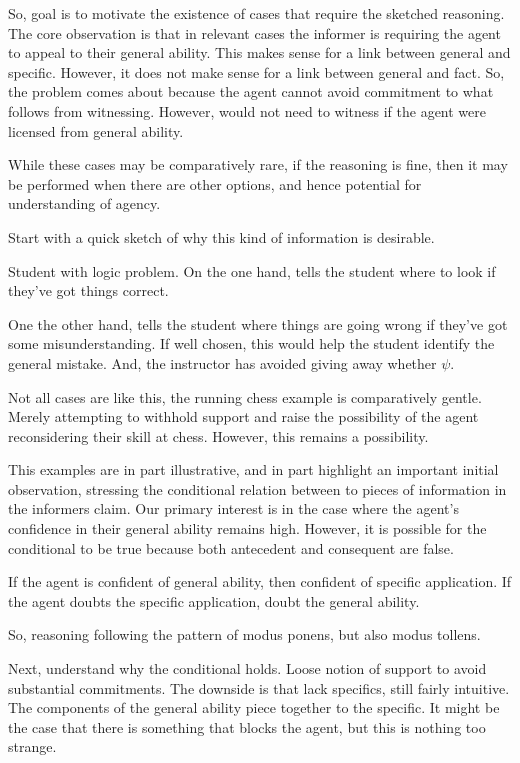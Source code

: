 \documentclass[10pt]{article}
\begin{document}
So, goal is to motivate the existence of cases that require the sketched reasoning.
The core observation is that in relevant cases the informer is requiring the agent to appeal to their general ability.
This makes sense for a link between general and specific.
However, it does not make sense for a link between general and fact.
So, the problem comes about because the agent cannot avoid commitment to what follows from witnessing.
However, would not need to witness if the agent were licensed from general ability.

While these cases may be comparatively rare, if the reasoning is fine, then it may be performed when there are other options, and hence potential for understanding of agency.

Start with a quick sketch of why this kind of information is desirable.

Student with logic problem.
On the one hand, tells the student where to look if they've got things correct.

One the other hand, tells the student where things are going wrong if they've got some misunderstanding.
If well chosen, this would help the student identify the general mistake.
And, the instructor has avoided giving away whether \(\psi\).

Not all cases are like this, the running chess example is comparatively gentle.
Merely attempting to withhold support and raise the possibility of the agent reconsidering their skill at chess.
However, this remains a possibility.

This examples are in part illustrative, and in part highlight an important initial observation, stressing the conditional relation between to pieces of information in the informers claim.
Our primary interest is in the case where the agent's confidence in their general ability remains high.
However, it is possible for the conditional to be true because both antecedent and consequent are false.

If the agent is confident of general ability, then confident of specific application.
If the agent doubts the specific application, doubt the general ability.

So, reasoning following the pattern of modus ponens, but also modus tollens.

Next, understand why the conditional holds.
Loose notion of support to avoid substantial commitments.
The downside is that lack specifics, still fairly intuitive.
The components of the general ability piece together to the specific.
It might be the case that there is something that blocks the agent, but this is nothing too strange.
\end{document}
